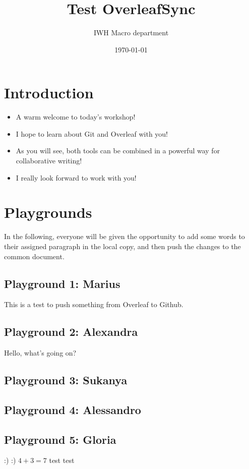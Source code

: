 \documentclass{article}
\title{Test OverleafSync}
\author{IWH Macro department}
\date{\today}
\begin{document}
\maketitle

\section{Introduction}

\begin{itemize} 
    \item A warm welcome to today's workshop!
    \item I hope to learn about Git and Overleaf with you!
    \item As you will see, both tools can be combined in a powerful way for collaborative writing!
    \item I really look forward to work with you!
\end{itemize}

\section{Playgrounds}
In the following, everyone will be given the opportunity to add some words to their assigned paragraph in the local copy, and then push the changes to the common document.

\subsection{Playground 1: Marius}
This is a test to push something from Overleaf to Github.

\subsection{Playground 2: Alexandra}
Hello, what's going on? 

\subsection{Playground 3: Sukanya}

\subsection{Playground 4: Alessandro}

\subsection{Playground 5: Gloria}
:)
:)
$4+3=7$
test test
\end{document}
